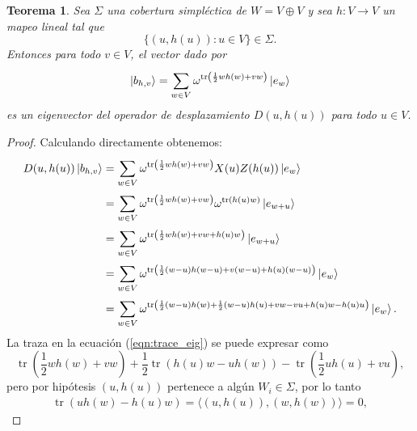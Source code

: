 \documentclass[a4paper,11pt]{report}
\DeclareMathOperator{\tr}{tr}
\newtheorem{theorem}{Teorema}
\begin{document}
  \begin{theorem}
    \label{thm:h_mubs}
    Sea $\Sigma$ una cobertura simpléctica de $W = V \oplus
    V$ y sea $h : V \to V$ un mapeo lineal tal que
    \begin{equation}
      \{(u,h(u)) : u \in V\} \in \Sigma.
    \end{equation}
    Entonces para todo $v \in V$, el vector dado por
    \begin{equation}
      \ket{b_{h,v}}
      = \sum_{w \in V}^{}
      \omega^{\tr\left(
          \frac{1}{2} w
        h(w) + v w
      \right) } \ket{e_w}
    \end{equation} 
    es un eigenvector del operador de desplazamiento
    $D(u,h(u))$ para todo $u \in V$.
  \end{theorem}
  \begin{proof}
    Calculando directamente obtenemos:
    \begin{align}
      D(u,h(u)) \ket{b_{h,v}}
      &= \sum_{w \in V}^{}
      \omega^{\tr\left(
          \frac{1}{2} w h(w) + v w
      \right) }
      X(u)Z(h(u)) \ket{e_w} \\
      &= \sum_{w \in V}^{}
      \omega^{\tr\left(
          \frac{1}{2} w h(w) + v w
      \right) }
      \omega^{\tr(h(u) w)}
      \ket{e_{w+u}} \\
      &= \sum_{w \in V}^{}
      \omega^{\tr\left(
          \frac{1}{2} w h(w) + v w + h(u) w
      \right) }
      \ket{e_{w+u}} \\
      &= \sum_{w \in V}^{}
      \omega^{\tr\left(
          \frac{1}{2} (w-u) h(w-u) + v (w-u) + h(u) (w-u)
      \right) }
      \ket{e_w} \\
      &= \sum_{w \in V}^{}
      \omega^{\tr\left(
        \frac{1}{2}(w-u) h(w) + \frac{1}{2}(w-u) h(u)
        + v w - v u + h(u) w - h(u) u
      \right) }
      \ket{e_w}.
      \label{eqn:trace_eig}
    \end{align}
    La traza en la ecuación (\ref{eqn:trace_eig}) se puede
    expresar como
    \begin{equation}
      \tr\left(
        \frac{1}{2} w h(w) + v w
      \right)
      + \frac{1}{2}\tr\left(
        h(u) w - u h(w)
      \right)
      - \tr\left(
        \frac{1}{2} u h(u) + v u
      \right),
    \end{equation}
    pero por hipótesis $(u,h(u))$ pertenece a algún $W_i \in
    \Sigma$, por lo tanto
    \begin{align}
      \tr\left( u h(w) - h(u) w \right)
      = \langle (u,h(u)), (w,h(w)) \rangle
      = 0,

\end{align}
\end{proof}
\end{document}
